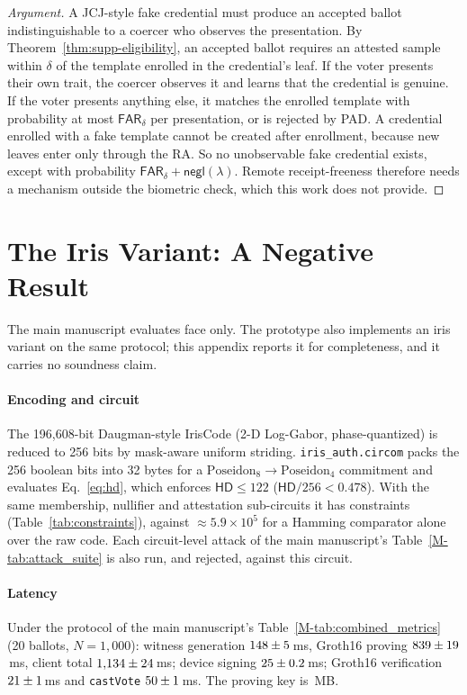 \documentclass[10pt,letterpaper,journal]{IEEEtran}
\begin{document}
\begin{proof}[Argument]
A JCJ-style fake credential must produce an accepted ballot indistinguishable to a coercer who observes the presentation. By Theorem~\ref{thm:supp-eligibility}, an accepted ballot requires an attested sample within $\delta$ of the template enrolled in the credential's leaf. If the voter presents their own trait, the coercer observes it and learns that the credential is genuine. If the voter presents anything else, it matches the enrolled template with probability at most $\mathsf{FAR}_\delta$ per presentation, or is rejected by PAD. A credential enrolled with a fake template cannot be created after enrollment, because new leaves enter only through the RA. So no unobservable fake credential exists, except with probability $\mathsf{FAR}_\delta + \mathsf{negl}(\lambda)$. Remote receipt-freeness therefore needs a mechanism outside the biometric check, which this work does not provide.
\end{proof}



\section{The Iris Variant: A Negative Result}
\label{sec:supp-iris}

The main manuscript evaluates face only. The prototype also implements an iris variant on the same protocol; this appendix reports it for completeness, and it carries no soundness claim.

\paragraph{Encoding and circuit} The 196,608-bit Daugman-style IrisCode (2-D Log-Gabor, phase-quantized) is reduced to 256 bits by mask-aware uniform striding. \texttt{iris\_auth.circom} packs the 256 boolean bits into 32 bytes for a $\text{Poseidon}_8 \rightarrow \text{Poseidon}_4$ commitment and evaluates Eq.~\eqref{eq:hd}, which enforces $\mathsf{HD} \le 122$ ($\mathsf{HD}/256 < 0.478$). With the same membership, nullifier and attestation sub-circuits it has \nIrisConstraints{} constraints (Table~\ref{tab:constraints}), against $\approx 5.9 \times 10^5$ for a Hamming comparator alone over the raw code. Each circuit-level attack of the main manuscript's Table~\ref{M-tab:attack_suite} is also run, and rejected, against this circuit.

\paragraph{Latency} Under the protocol of the main manuscript's Table~\ref{M-tab:combined_metrics} (20 ballots, $N = 1{,}000$): witness generation $148 \pm 5$\,ms, Groth16 proving $839 \pm 19$\,ms, client total $1{,}134 \pm 24$\,ms; device signing $25 \pm 0.2$\,ms; Groth16 verification $21 \pm 1$\,ms and \texttt{castVote} $50 \pm 1$\,ms. The proving key is \nIrisKeyMB\,MB.
\end{document}
